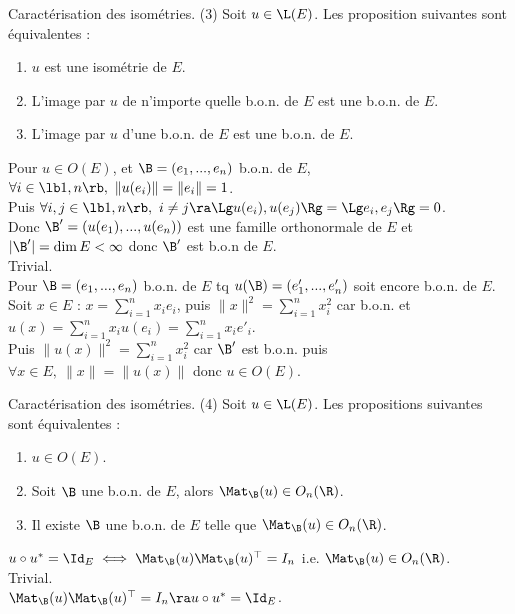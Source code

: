 \documentclass[11pt]{article}
\begin{document}
\begin{thm}{Caractérisation des isométries. (3)}{}
    Soit $u\in\L(E)$. Les proposition suivantes sont équivalentes :
    \begin{enumerate}
        \item $u$ est une isométrie de $E$.
        \item L'image par $u$ de n'importe quelle b.o.n. de $E$ est une b.o.n. de $E$.
        \item L'image par $u$ d'une b.o.n. de $E$ est une b.o.n. de $E$.
    \end{enumerate}
    \tcblower
     Pour $u\in O(E)$, et $\B=(e_1,...,e_n)$ b.o.n. de $E$, $\forall i \in \lb1,n\rb, ~ \|u(e_i)\|=\|e_i\|=1$.\\
    Puis $\forall i,j \in \lb1,n\rb, ~ i\neq j \ra \Lg u(e_i), u(e_j)\Rg = \Lg e_i, e_j \Rg = 0$.\\
    Donc $\B'=(u(e_1),...,u(e_n))$ est une famille orthonormale de $E$ et $|\B'|=\dim E < \infty$ donc $\B'$ est b.o.n de $E$.\\
     Trivial.\\ 
     Pour $\B=(e_1,...,e_n)$ b.o.n. de $E$ tq $u(\B)=(e'_1,...,e'_n)$ soit encore b.o.n. de $E$.\\
    Soit $x\in E$ : $x=\sum_{i=1}^nx_ie_i$, puis $\|x\|^2=\sum_{i=1}^nx_i^2$ car b.o.n. et $u(x)=\sum_{i=1}^nx_iu(e_i)=\sum_{i=1}^nx_ie'_i$.\\
    Puis $\|u(x)\|^2=\sum_{i=1}^nx_i^2$ car $\B'$ est b.o.n. puis $\forall x \in E, ~ \|x\|=\|u(x)\|$ donc $u\in O(E)$.
\end{thm}

\vspace*{-0.8cm}

\begin{thm}{Caractérisation des isométries. (4)}{}
    Soit $u\in\L(E)$. Les propositions suivantes sont équivalentes :
    \begin{enumerate}
        \item $u\in O(E)$.
        \item Soit $\B$ une b.o.n. de $E$, alors $\Mat_\B(u)\in O_n(\R)$.
        \item Il existe $\B$ une b.o.n. de $E$ telle que $\Mat_\B(u)\in O_n(\R)$.
    \end{enumerate}
    \tcblower
     $u\circ u^*=\Id_E \iff \Mat_\B(u)\Mat_\B(u)^\top=I_n$ i.e. $\Mat_\B(u)\in O_n(\R)$.\\
     Trivial.\\
     $\Mat_\B(u)\Mat_\B(u)^\top = I_n \ra u\circ u^* = \Id_E$.
\end{thm}
\end{document}
